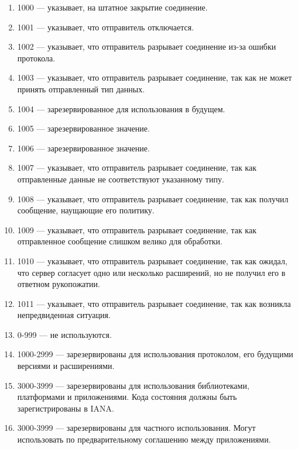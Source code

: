 \begin{enumerate} 
  \item 1000 — указывает, на штатное закрытие соединение.
  
  \item 1001 — указывает, что отправитель отключается.
  
  \item 1002 — указывает, что отправитель разрывает соединение из-за ошибки протокола.

  \item 1003 — указывает, что отправитель разрывает соединение, так как не может принять отправленный тип данных.

  \item 1004 — зарезервированное для использования в будущем.

  \item 1005 — зарезервированное значение.

  \item 1006 — зарезервированное значение.

  \item 1007 — указывает, что отправитель разрывает соединение, так как отправленные данные не соответствуют указанному типу.

  \item 1008 — указывает, что отправитель разрывает соединение, так как получил сообщение, наущающие его политику.

  \item 1009 — указывает, что отправитель разрывает соединение, так как отправленное сообщение слишком велико для обработки.

  \item 1010 — указывает, что отправитель разрывает соединение, так как ожидал, что сервер согласует одно или несколько расширений, но не получил его в ответном рукопожатии.

  \item 1011 — указывает, что отправитель разрывает соединение, так как возникла непредвиденная ситуация.

  \item 0-999 — не используются.

  \item 1000-2999 — зарезервированы для использования протоколом, его будущими версиями и расширениями.

  \item 3000-3999 — зарезервированы для использования библиотеками, платформами и приложениями. Кода состояния должны быть зарегистрированы в IANA.

  \item 3000-3999 — зарезервированы для частного использования. Могут использовать по предварительному соглашению между приложениями.
\end{enumerate}


